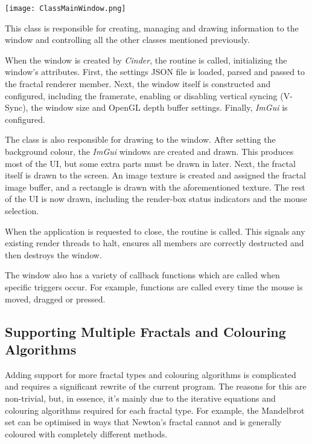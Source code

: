 \FloatBarrier
\begin{figure*}[htp]
	\centering
	\texttt{[image: ClassMainWindow.png]}
\end{figure*}
\FloatBarrier

This class is responsible for creating, managing and drawing information to the window and controlling all the other classes mentioned previously.

\vspace{0.5cm}
\noindent
When the window is created by \textit{Cinder}, the  routine is called, initializing the window's attributes. First, the settings JSON file is loaded, parsed and passed to the fractal renderer member. Next, the window itself is constructed and configured, including the framerate, enabling or disabling vertical syncing (V-Sync), the window size and OpenGL depth buffer settings. Finally, \textit{ImGui} is configured.

The  class is also responsible for drawing to the window. After setting the background colour, the \textit{ImGui} windows are created and drawn. This produces most of the UI, but some extra parts must be drawn in later. Next, the fractal itself is drawn to the screen. An image texture is created and assigned the fractal image buffer, and a rectangle is drawn with the aforementioned texture. The rest of the UI is now drawn, including the render-box status indicators and the mouse selection.

When the application is requested to close, the  routine is called. This signals any existing render threads to halt, ensures all members are correctly destructed and then destroys the window.

The window also has a variety of callback functions which are called when specific triggers occur. For example, functions are called every time the mouse is moved, dragged or pressed.

\subsection{Supporting Multiple Fractals and Colouring Algorithms}

Adding support for more fractal types and colouring algorithms is complicated and requires a significant rewrite of the current program. The reasons for this are non-trivial, but, in essence, it's mainly due to the iterative equations and colouring algorithms required for each fractal type. For example, the Mandelbrot set can be optimised in ways that Newton's fractal cannot and is generally coloured with completely different methods.

